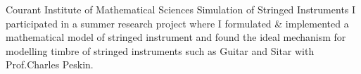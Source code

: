 {Courant Institute of Mathematical Sciences}
{Simulation of Stringed Instruments}
{
	I participated in a summer research project where I formulated & implemented a mathematical model of stringed instrument and found the ideal mechanism for modelling timbre of stringed instruments such as Guitar and Sitar with Prof.Charles Peskin.
}
